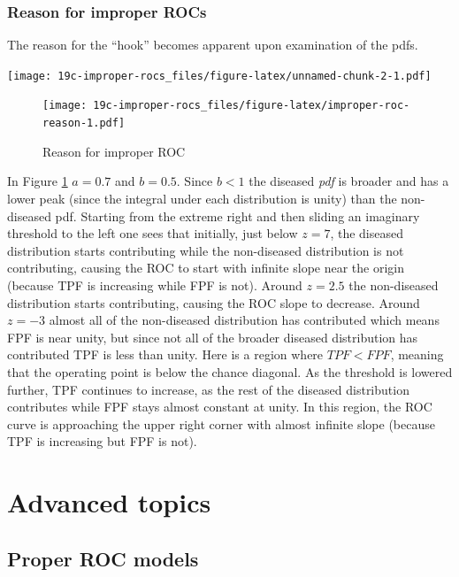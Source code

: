 \documentclass[
]{book}
\begin{document}
\hypertarget{reason-for-improper-rocs-1}{%
\section{Reason for improper ROCs}\label{reason-for-improper-rocs-1}}

The reason for the ``hook'' becomes apparent upon examination of the pdfs.

\texttt{[image: 19c-improper-rocs\_files/figure-latex/unnamed-chunk-2-1.pdf]}

\begin{figure}
\centering
\texttt{[image: 19c-improper-rocs\_files/figure-latex/improper-roc-reason-1.pdf]}
\caption{\label{fig:improper-roc-reason}Reason for improper ROC}
\end{figure}

In Figure \ref{fig:improper-roc-reason} \(a = 0.7\) and \(b = 0.5\). Since \(b < 1\) the diseased \emph{pdf} is broader and has a lower peak (since the integral under each distribution is unity) than the non-diseased pdf. Starting from the extreme right and then sliding an imaginary threshold to the left one sees that initially, just below \(z = 7\), the diseased distribution starts contributing while the non-diseased distribution is not contributing, causing the ROC to start with infinite slope near the origin (because TPF is increasing while FPF is not). Around \(z = 2.5\) the non-diseased distribution starts contributing, causing the ROC slope to decrease. Around \(z = -3\) almost all of the non-diseased distribution has contributed which means FPF is near unity, but since not all of the broader diseased distribution has contributed TPF is less than unity. Here is a region where \(TPF < FPF\), meaning that the operating point is below the chance diagonal. As the threshold is lowered further, TPF continues to increase, as the rest of the diseased distribution contributes while FPF stays almost constant at unity. In this region, the ROC curve is approaching the upper right corner with almost infinite slope (because TPF is increasing but FPF is not).

\hypertarget{part-advanced-topics}{%
\part*{Advanced topics}\label{part-advanced-topics}}

\hypertarget{proper-roc-models}{%
\chapter{Proper ROC models}\label{proper-roc-models}}
\end{document}
